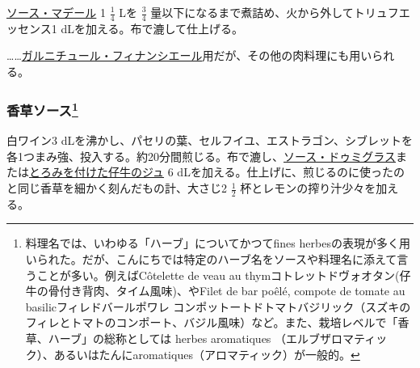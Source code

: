 \begin{recette}


\protect\hyperlink{sauce-madere}{ソース・マデール} 1 \(\frac{1}{4}\) Lを
\(\frac{3}{4}\) 量以下になるまで煮詰め、火から外してトリュフエッセンス1
dLを加える。布で漉して仕上げる。

\ldots{}\ldots{}\protect\hyperlink{garniture-a-la-financiere}{ガルニチュール・フィナンシエール}用だが、その他の肉料理にも用いられる。

\atoaki{}

\hypertarget{sauce-aux-fines-herbes}{%
\subsubsection[香草ソース]{\texorpdfstring{香草ソース\footnote{料理名では、いわゆる「ハーブ」についてかつてfines
  herbesの表現が多く用いられた。だが、こんにちでは特定のハーブ名をソースや料理名に添えて言うことが多い。例えばCôtelette
  de veau au
  thymコトレットドヴォオタン(仔牛の骨付き背肉、タイム風味)、やFilet de
  bar poêlé, compote de tomate au basilicフィレドバールポワレ
  コンポットートドトマトバジリック（スズキのフィレとトマトのコンポート、バジル風味）など。また、栽培レベルで「香草、ハーブ」の総称としては
  herbes aromatiques
  （エルブザロマティック）、あるいはたんにaromatiques（アロマティック）が一般的。}}{香草ソース}}\label{sauce-aux-fines-herbes}}


 

白ワイン3
dLを沸かし、パセリの葉、セルフイユ、エストラゴン、シブレットを各1つまみ強、投入する。約20分間煎じる。布で漉し、\protect\hyperlink{sauce-demi-glace}{ソース・ドゥミグラス}または\protect\hyperlink{jus-de-veau-lie}{とろみを付けた仔牛のジュ}
6
dLを加える。仕上げに、煎じるのに使ったのと同じ香草を細かく刻んだもの計、大さじ2
\(\frac{1}{2}\) 杯とレモンの搾り汁少々を加える。


\end{recette}
